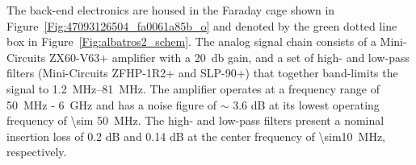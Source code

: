 The back-end electronics are housed in the Faraday cage shown in Figure~\ref{Fig:47093126504_fa0061a85b_o} and denoted by the green dotted line box in Figure~\ref{Fig:albatros2_schem}. The analog signal chain consists of a Mini-Circuits ZX60-V63+ amplifier with a \SI{20}{\decibel} gain, and a set of high- and low-pass filters (Mini-Circuits ZFHP-1R2+ and SLP-90+) that together band-limits the signal to \SIrange{1.2}{81}{\mega\hertz}. The amplifier operates at a frequency range of \SI{50}{\mega\hertz} - \SI{6}{\giga\hertz} and has a noise figure of $\sim$ 3.6 dB at its lowest operating frequency of \SI{\sim 50}{MHz}. The high- and low-pass filters present a nominal insertion loss of 0.2 dB and 0.14 dB at the center frequency of \SI{\sim10}{MHz}, respectively. 

